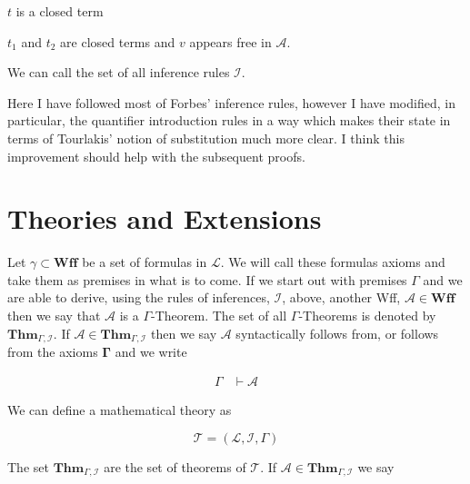 \documentclass[12pt]{article}
\newcommand{\bv}[1]{\boldsymbol{#1}}
\newcommand{\mc}[1]{\mathcal{#1}}
\newcommand{\bc}[1]{\bv{\mc{#1}}}
\begin{document}
\hrulefill
\begin{ND}[Rule of $=I$][][][][.6\linewidth]
\end{ND}
$t$ is a closed term

\hrulefill
\begin{ND}[Rule of $=E$][][][][.6\linewidth]
\ndljg{Y}{(k)}{$\mc{A}[v\leftarrow t_1]$}{}
\ndljg{X\cup Y}{(l)}{$\mc{A}[v \leftarrow t_2]$}{$j,k,=E$}
\end{ND}
$t_1$ and $t_2$ are closed terms and $v$ appears free in $\mc{A}$.

\hrulefill

We can call the set of all inference rules $\bc{I}$.

Here I have followed most of Forbes' inference rules, however I have modified, in particular, the quantifier introduction rules in a way which makes their state in terms of Tourlakis' notion of substitution much more clear. I think this improvement should help with the subsequent proofs.

\section*{Theories and Extensions}

Let $\gamma \subset \mathbf{Wff}$ be a set of formulas in $\mc{L}$. We will call these formulas axioms and take them as premises in what is to come. If we start out with premises $\Gamma$ and we are able to derive, using the rules of inferences, $\bc{I}$, above, another Wff, $\mc{A}\in\textbf{Wff}$ then we say that $\mc{A}$ is a $\Gamma$-Theorem. The set of all $\Gamma$-Theorems is denoted by $\mathbf{Thm}_{\Gamma,\bc{I}}$. If $\mc{A} \in \mathbf{Thm}_{\Gamma,\bc{I}}$ then we say $\mc{A}$ syntactically follows from, or follows from the axioms $\bv{\Gamma}$ and we write

\begin{equation}
\begin{split}
\Gamma &\vdash \mc{A}
\end{split}
\end{equation}


We can define a mathematical theory as

\begin{equation}
\bc{T} = (\bv{\mc{L}}, \bc{I}, \Gamma)
\end{equation}

The set $\mathbf{Thm}_{\Gamma,\bc{I}}$ are the set of theorems of $\bc{T}$. If $\mc{A} \in \textbf{Thm}_{\Gamma,\bc{I}}$ we say
\end{document}
